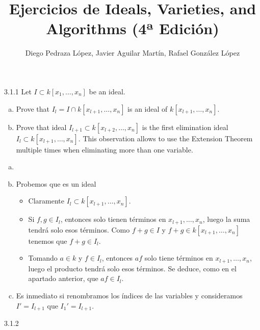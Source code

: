 \documentclass[twoside]{article}
\begin{document}
\title{Ejercicios de Ideals, Varieties, and Algorithms (4ª Edición)}
\author{Diego Pedraza López, Javier Aguilar Martín, Rafael González López}
\maketitle

\begin{ejercicio}{3.1.1}
Let $I\subset k[x_1,\dotsc,x_n]$ be an ideal.
\begin{enumerate}[a.]
\item Prove that $I_l = I\cap k[x_{l+1},\dotsc,x_n]$ is an ideal of $k[x_{l+1},\dotsc,x_n]$.
\item Prove that ideal $I_{l+1} \subset k[x_{l+2},\dotsc,x_n]$ is the first elimination ideal $I_l \subset k[x_{l+1},\dotsc,x_n]$. This observation allows to use the Extension Theorem multiple times when eliminating more than one variable.
\end{enumerate}
\end{ejercicio}
\begin{solucion}
\begin{enumerate}[a.]
\item[]
\item Probemos que es un ideal
\begin{itemize}
\item Claramente $I_l \subset k[x_{l+1},\dotsc,x_n]$.
\item Si $f,g\in I_l$, entonces solo tienen términos en $x_{l+1},\dotsc,x_n$, luego la suma tendrá solo esos términos. Como $f+g\in I$ y $f+g\in k[x_{l+1},\dotsc,x_n]$ tenemos que $f+g\in I_l$.
\item Tomando $a\in k$ y $f \in I_l$, entonces $af$ solo tiene términos en $x_{l+1},\dotsc,x_n$, luego el producto tendrá solo esos términos. Se deduce, como en el apartado anterior, que $af\in I_l$.
\end{itemize}
\item Es inmediato si renombramos los índices de las variables y consideramos $I'=I_{l+1}$ que $I_1'=I_{l+1}$.
\end{enumerate}
\end{solucion}

\newpage

\begin{ejercicio}{3.1.2}

\end{ejercicio}
\begin{solucion}
\begin{enumerate}[a.]
\end{enumerate}
\end{solucion}
\end{document}
